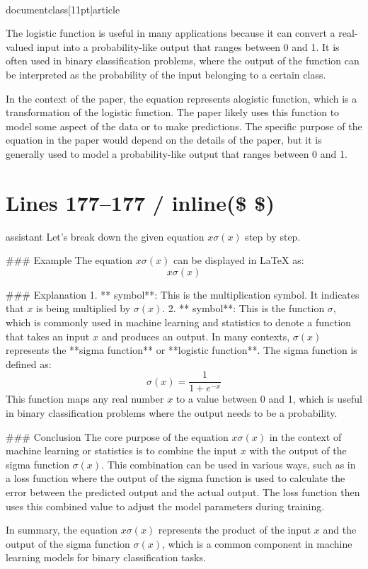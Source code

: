 \\documentclass[11pt]{article}
\begin{document}
The logistic function is useful in many applications because it can convert a real-valued input into a probability-like output that ranges between 0 and 1. It is often used in binary classification problems, where the output of the function can be interpreted as the probability of the input belonging to a certain class.

In the context of the paper, the equation represents alogistic function, which is a transformation of the logistic function. The paper likely uses this function to model some aspect of the data or to make predictions. The specific purpose of the equation in the paper would depend on the details of the paper, but it is generally used to model a probability-like output that ranges between 0 and 1.


\section*{Lines 177–177 / inline(\$ \$) }
assistant
Let's break down the given equation \( x \sigma(x) \) step by step.

### Example
The equation \( x \sigma(x) \) can be displayed in LaTeX as:
\[ x \sigma(x) \]

### Explanation
1. ** symbol**: This is the multiplication symbol. It indicates that \( x \) is being multiplied by \( \sigma(x) \).
2. ** symbol**: This is the function \( \sigma \), which is commonly used in machine learning and statistics to denote a function that takes an input \( x \) and produces an output. In many contexts, \( \sigma(x) \) represents the **sigma function** or **logistic function**. The sigma function is defined as:
   \[
   \sigma(x) = \frac{1}{1 + e^{-x}}
   \]
   This function maps any real number \( x \) to a value between 0 and 1, which is useful in binary classification problems where the output needs to be a probability.

### Conclusion
The core purpose of the equation \( x \sigma(x) \) in the context of machine learning or statistics is to combine the input \( x \) with the output of the sigma function \( \sigma(x) \). This combination can be used in various ways, such as in a loss function where the output of the sigma function is used to calculate the error between the predicted output and the actual output. The loss function then uses this combined value to adjust the model parameters during training.

In summary, the equation \( x \sigma(x) \) represents the product of the input \( x \) and the output of the sigma function \( \sigma(x) \), which is a common component in machine learning models for binary classification tasks.
\end{document}
